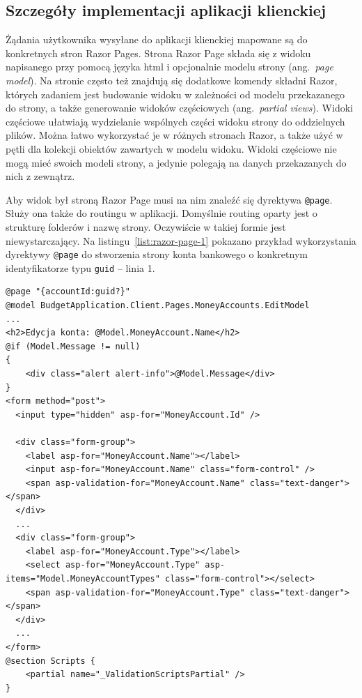 \subsection{Szczegóły implementacji aplikacji klienckiej}
\label{subsec:szczegoly-implementacji-client}

Żądania użytkownika wysyłane do aplikacji klienckiej mapowane są do konkretnych stron Razor Pages. Strona Razor Page składa się z widoku napisanego przy pomocą języka html i opcjonalnie modelu strony (ang.~\emph{page model}). Na stronie często też znajdują się dodatkowe komendy składni Razor, których zadaniem jest budowanie widoku w zależności od modelu przekazanego do strony, a także generowanie widoków częściowych (ang.~\emph{partial views}). Widoki częściowe ułatwiają wydzielanie wspólnych części widoku strony do oddzielnych plików. Można łatwo wykorzystać je w różnych stronach Razor, a także użyć w pętli dla kolekcji obiektów zawartych w modelu widoku. Widoki częściowe nie mogą mieć swoich modeli strony, a jedynie polegają na danych przekazanych do nich z zewnątrz.

Aby widok był stroną Razor Page musi na nim znaleźć się dyrektywa \texttt{@page}. Służy ona także do routingu w aplikacji. Domyślnie routing oparty jest o strukturę folderów i nazwę strony. Oczywiście w takiej formie jest niewystarczający. Na listingu~\ref{list:razor-page-1} pokazano przykład wykorzystania dyrektywy \texttt{@page} do stworzenia strony konta bankowego o konkretnym identyfikatorze typu \texttt{guid} -- linia 1.

{\belowcaptionskip=-10pt
\begin{lstlisting}[label=list:razor-page-1,
    caption=Przykład strony Razor Page: \texttt{Edit.cshtml}]
@page "{accountId:guid?}"
@model BudgetApplication.Client.Pages.MoneyAccounts.EditModel
...
<h2>Edycja konta: @Model.MoneyAccount.Name</h2>
@if (Model.Message != null)
{
    <div class="alert alert-info">@Model.Message</div>
}
<form method="post">
  <input type="hidden" asp-for="MoneyAccount.Id" />

  <div class="form-group">
    <label asp-for="MoneyAccount.Name"></label>
    <input asp-for="MoneyAccount.Name" class="form-control" />
    <span asp-validation-for="MoneyAccount.Name" class="text-danger"></span>
  </div>
  ...
  <div class="form-group">
    <label asp-for="MoneyAccount.Type"></label>
    <select asp-for="MoneyAccount.Type" asp-items="Model.MoneyAccountTypes" class="form-control"></select>
    <span asp-validation-for="MoneyAccount.Type" class="text-danger"></span>
  </div>
  ...
</form>
@section Scripts {
    <partial name="_ValidationScriptsPartial" />
}
\end{lstlisting}
}

